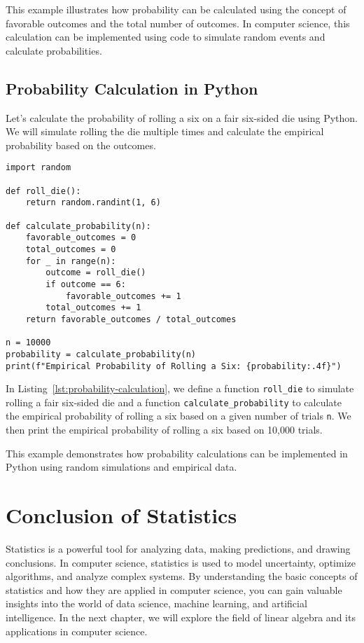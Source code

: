 This example illustrates how probability can be calculated using the concept of favorable outcomes and the total number of outcomes. In computer science, this calculation can be implemented using code to simulate random events and calculate probabilities.

\subsection{Probability Calculation in Python}

Let's calculate the probability of rolling a six on a fair six-sided die using Python. We will simulate rolling the die multiple times and calculate the empirical probability based on the outcomes.

\begin{lstlisting}[caption={Probability Calculation in Python}, label={lst:probability-calculation}]
import random

def roll_die():
    return random.randint(1, 6)

def calculate_probability(n):
    favorable_outcomes = 0
    total_outcomes = 0
    for _ in range(n):
        outcome = roll_die()
        if outcome == 6:
            favorable_outcomes += 1
        total_outcomes += 1
    return favorable_outcomes / total_outcomes

n = 10000
probability = calculate_probability(n)
print(f"Empirical Probability of Rolling a Six: {probability:.4f}")
\end{lstlisting}

In Listing~\ref{lst:probability-calculation}, we define a function \texttt{roll\_die} to simulate rolling a fair six-sided die and a function \texttt{calculate\_probability} to calculate the empirical probability of rolling a six based on a given number of trials \texttt{n}. We then print the empirical probability of rolling a six based on 10,000 trials.

This example demonstrates how probability calculations can be implemented in Python using random simulations and empirical data.

\section{Conclusion of Statistics}

Statistics is a powerful tool for analyzing data, making predictions, and drawing conclusions. In computer science, statistics is used to model uncertainty, optimize algorithms, and analyze complex systems. By understanding the basic concepts of statistics and how they are applied in computer science, you can gain valuable insights into the world of data science, machine learning, and artificial intelligence. In the next chapter, we will explore the field of linear algebra and its applications in computer science.

